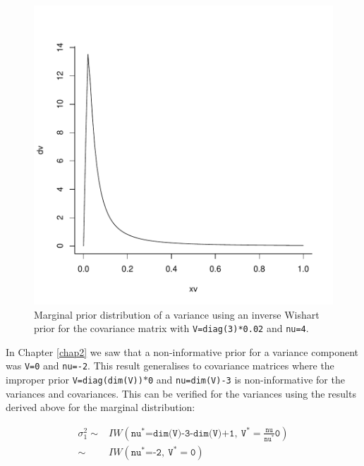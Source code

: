 \documentclass{article}
\begin{document}
\begin{figure}[!h]
\begin{center}
\includegraphics{Lecture3-028}
\end{center}
\caption{Marginal prior distribution of a variance using an inverse Wishart prior for the covariance matrix with \texttt{V=diag(3)*0.02} and \texttt{nu=4}.}
\label{NIc-fig}
\end{figure}


In Chapter \ref{chap2} we saw that a non-informative prior for a variance component was \texttt{V=0} and \texttt{nu=-2}. This result generalises to covariance matrices where the improper prior \texttt{V=diag(dim(V))$\ast$0} and \texttt{nu=dim(V)-3} is non-informative for the variances and covariances. This can be verified for the variances using the results derived above for the marginal distribution:

\begin{displaymath}
\begin{array}{rl}
\sigma^{2}_{1} \sim& IW\left(\texttt{nu}^{\ast}\texttt{=dim(V)-3-dim(V)+1},\ \texttt{V}^{\ast}=\frac{\texttt{nu}}{\texttt{nu}^{\ast}}\texttt{0}\right)\\
               \sim& IW\left(\texttt{nu}^{\ast}\texttt{=-2},\ \texttt{V}^{\ast}=\texttt{0}\right)\\

\end{array}
\end{displaymath}
\end{document}
